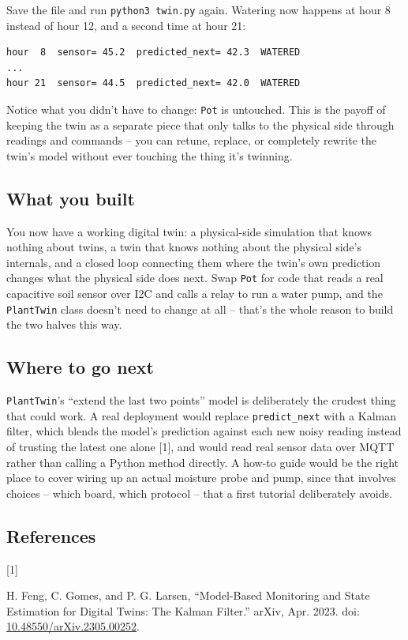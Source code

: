 \documentclass[
  12pt,
  a4paper,
]{article}
\newlength{\cslhangindent}
\newlength{\csllabelwidth}
\newenvironment{CSLReferences}[2] %
 {\begin{list}{}{%
  \setlength{\itemindent}{0pt}
  \setlength{\leftmargin}{0pt}
  \setlength{\parsep}{0pt}
  \ifodd #1
   \setlength{\leftmargin}{\cslhangindent}
   \setlength{\itemindent}{-1\cslhangindent}
  \fi
  \setlength{\itemsep}{#2\baselineskip}}}
 {\end{list}}
\newcommand{\CSLLeftMargin}[1]{\parbox[t]{\csllabelwidth}{\strut#1\strut}}
\newcommand{\CSLRightInline}[1]{\parbox[t]{\linewidth - \csllabelwidth}{\strut#1\strut}}
\begin{document}
Save the file and run \texttt{python3}\texttt{\ twin.py} again.
Watering now happens at hour 8 instead of hour 12, and a second time at
hour 21:

\begin{verbatim}
hour  8  sensor= 45.2  predicted_next= 42.3  WATERED
...
hour 21  sensor= 44.5  predicted_next= 42.0  WATERED
\end{verbatim}

Notice what you didn't have to change: \texttt{Pot} is untouched. This
is the payoff of keeping the twin as a separate piece that only talks to
the physical side through readings and commands -- you can retune,
replace, or completely rewrite the twin's model without ever touching
the thing it's twinning.

\subsection{What you built}\label{what-you-built}

You now have a working digital twin: a physical-side simulation that
knows nothing about twins, a twin that knows nothing about the physical
side's internals, and a closed loop connecting them where the twin's own
prediction changes what the physical side does next. Swap \texttt{Pot}
for code that reads a real capacitive soil sensor over I2C and calls a
relay to run a water pump, and the \texttt{PlantTwin} class doesn't need
to change at all -- that's the whole reason to build the two halves this
way.

\subsection{Where to go next}\label{where-to-go-next}

\texttt{PlantTwin}'s ``extend the last two points'' model is
deliberately the crudest thing that could work. A real deployment would
replace \texttt{predict\_}\texttt{next} with a Kalman filter,
which blends the model's prediction against each new noisy reading
instead of trusting the latest one alone {[}1{]}, and would read real
sensor data over MQTT rather than calling a Python method directly. A
how-to guide would be the right place to cover wiring up an actual
moisture probe and pump, since that involves choices -- which board,
which protocol -- that a first tutorial deliberately avoids.

\subsection{References}\label{references}

\label{refs}
\begin{CSLReferences}{0}{0}
\CSLLeftMargin{{[}1{]} }%
\CSLRightInline{H. Feng, C. Gomes, and P. G. Larsen, {``Model-{Based}
{Monitoring} and {State} {Estimation} for {Digital} {Twins}: {The}
{Kalman} {Filter}.''} arXiv, Apr. 2023. doi:
\href{https://doi.org/10.48550/arXiv.2305.00252}{10.48550/arXiv.2305.00252}.}

\end{CSLReferences}
\end{document}
